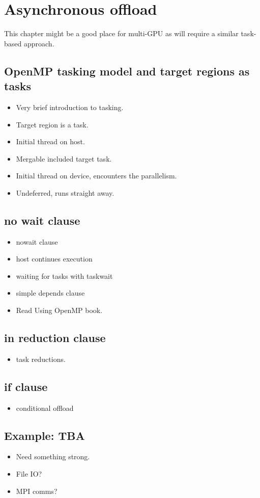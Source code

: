 
\def\ArtDir{06.Async/figures}

\chapter{Asynchronous offload}
\label{chapter:async}

This chapter might be a good place for multi-GPU as will require a similar task-based approach.


\section{OpenMP tasking model and target regions as tasks}
\begin{itemize}
  \item Very brief introduction to tasking.
  \item Target region is a task.
  \item Initial thread on host.
  \item Mergable included target task.
  \item Initial thread on device, encounters the parallelism.
  \item Undeferred, runs straight away.
\end{itemize}

\section{no wait clause}
\begin{itemize}
  \item nowait clause
  \item host continues execution
  \item waiting for tasks with taskwait
  \item simple depends clause
  \item Read Using OpenMP book.
\end{itemize}

\section{in reduction clause}
\label{sec:in_reduction}
\begin{itemize}
  \item task reductions.
\end{itemize}

\section{if clause}
\label{sec:if_clause}
\begin{itemize}
  \item conditional offload
\end{itemize}

\section{Example: TBA}
\begin{itemize}
  \item Need something strong.
  \item File IO?
  \item MPI comms?
\end{itemize}

